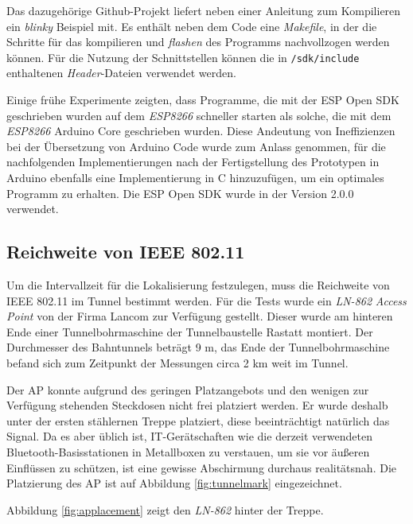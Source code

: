 Das dazugehörige Github-Projekt liefert neben einer Anleitung zum Kompilieren ein \textit{blinky} Beispiel mit.
Es enthält neben dem Code eine \emph{Makefile}, in der die Schritte für das kompilieren und \emph{flashen} des Programms nachvollzogen werden können.
Für die Nutzung der Schnittstellen können die in \texttt{/sdk/include} enthaltenen \emph{Header}-Dateien verwendet werden. 

Einige frühe Experimente zeigten, dass Programme, die mit der ESP Open SDK geschrieben wurden auf dem \emph{ESP8266} schneller starten als solche, die mit dem \emph{ESP8266} Arduino Core geschrieben wurden.
Diese Andeutung von Ineffizienzen bei der Übersetzung von Arduino Code wurde zum Anlass genommen, für die nachfolgenden Implementierungen nach der Fertigstellung des Prototypen in Arduino ebenfalls eine Implementierung in C hinzuzufügen, um ein optimales Programm zu erhalten. 
Die ESP Open SDK wurde in der Version 2.0.0 verwendet.




\subsection{Reichweite von IEEE 802.11}
\label{ch:phase1:sec:rangewlan}
Um die Intervallzeit für die Lokalisierung festzulegen, muss die Reichweite von IEEE 802.11 im Tunnel bestimmt werden.
Für die Tests wurde ein \emph{LN-862} \emph{Access Point} von der Firma Lancom zur Verfügung gestellt.
Dieser wurde am hinteren Ende einer Tunnelbohrmaschine der Tunnelbaustelle Rastatt montiert.
Der Durchmesser des Bahntunnels beträgt 9 m, das Ende der Tunnelbohrmaschine befand sich zum Zeitpunkt der Messungen circa 2 km weit im Tunnel.

Der AP konnte aufgrund des geringen Platzangebots und den wenigen zur Verfügung stehenden Steckdosen nicht frei platziert werden.
Er wurde deshalb unter der ersten stählernen Treppe platziert, diese beeinträchtigt natürlich das Signal.
Da es aber üblich ist, IT-Gerätschaften wie die derzeit verwendeten Bluetooth-Basisstationen in Metallboxen zu verstauen, um sie vor äußeren Einflüssen zu schützen, ist eine gewisse Abschirmung durchaus realitätsnah.
Die Platzierung des AP ist auf Abbildung \ref{fig:tunnelmark} eingezeichnet.

Abbildung \ref{fig:applacement} zeigt den \emph{LN-862} hinter der Treppe.

